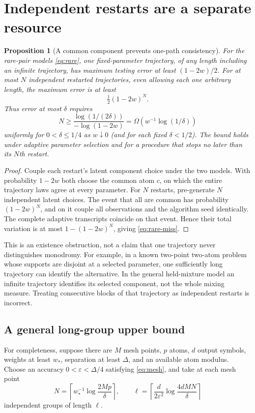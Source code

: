 \documentclass[11pt]{article}
\newtheorem{proposition}[theorem]{Proposition}
\theoremstyle{remark}\newtheorem{remark}[theorem]{Remark}
\begin{document}
\section{Independent restarts are a separate resource}
\begin{proposition}[A common component prevents one-path consistency]\label{prop:onepath}
For the rare-pair models \eqref{eq:rare}, one fixed-parameter trajectory, of any length including an infinite trajectory, has maximum testing error at least $(1-2w)/2$. For at most $N$ independent restarted trajectories, even allowing each one arbitrary length, the maximum error is at least
\begin{equation}\label{eq:rare-miss}
 \tfrac12(1-2w)^N.
\end{equation}
Thus error at most $\delta$ requires
\[
 N\geq\frac{\log(1/(2\delta))}{-\log(1-2w)}
 =\Omega(w^{-1}\log(1/\delta))
\]
uniformly for $0<\delta\leq1/4$ as $w\downarrow0$ (and for each fixed $\delta<1/2$). The bound holds under adaptive parameter selection and for a procedure that stops no later than its $N$th restart.
\end{proposition}
\begin{proof}
Couple each restart's latent component choice under the two models. With probability $1-2w$ both choose the common atom $c$, on which the entire trajectory laws agree at every parameter. For $N$ restarts, pre-generate $N$ independent latent choices. The event that all are common has probability $(1-2w)^N$, and on it couple all observations and the algorithm seed identically. The complete adaptive transcripts coincide on that event. Hence their total variation is at most $1-(1-2w)^N$, giving \eqref{eq:rare-miss}.
\end{proof}
This is an existence obstruction, not a claim that one trajectory never distinguishes monodromy. For example, in a known two-point two-atom problem whose supports are disjoint at a selected parameter, one sufficiently long trajectory can identify the alternative. In the general held-mixture model an infinite trajectory identifies its selected component, not the whole mixing measure. Treating consecutive blocks of that trajectory as independent restarts is incorrect.

\subsection{A general long-group upper bound}
For completeness, suppose there are $M$ mesh points, $p$ atoms, $d$ output symbols, weights at least $w_*$, separation at least $\Delta$, and an available atom modulus. Choose an accuracy $0<\varepsilon<\Delta/4$ satisfying \eqref{eq:mesh}, and take at each mesh point
\begin{equation}\label{eq:restartupper}
 N=\left\lceil w_*^{-1}\log\frac{2Mp}{\delta}\right\rceil,
 \qquad
 \ell=\left\lceil\frac{d}{2\varepsilon^2}
 \log\frac{4dMN}{\delta}\right\rceil
\end{equation}
independent groups of length $\ell$.
\end{document}
